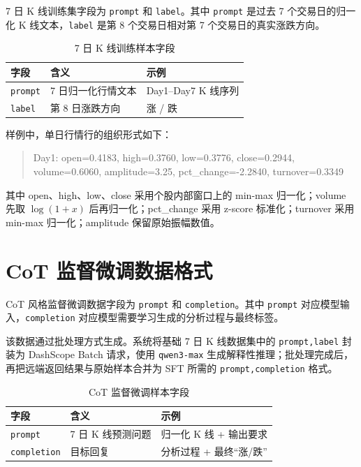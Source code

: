 7 日 K 线训练集字段为 \texttt{prompt} 和 \texttt{label}。其中 \texttt{prompt} 是过去 7 个交易日的归一化 K 线文本，\texttt{label} 是第 8 个交易日相对第 7 个交易日的真实涨跌方向。

\begin{table}[htbp]
  \centering
  \caption{7 日 K 线训练样本字段}
  \begin{tabular}{lll}
    \toprule
    字段 & 含义 & 示例 \\
    \midrule
    \texttt{prompt} & 7 日归一化行情文本 & Day1--Day7 K 线序列 \\
    \texttt{label} & 第 8 日涨跌方向 & 涨 / 跌 \\
    \bottomrule
  \end{tabular}
\end{table}

样例中，单日行情行的组织形式如下：

\begin{quote}\small
Day1: open=0.4183, high=0.3760, low=0.3776, close=0.2944, volume=0.6060, amplitude=3.25, pct\_change=-2.2840, turnover=0.3349
\end{quote}

其中 open、high、low、close 采用个股内部窗口上的 min-max 归一化；volume 先取 \(\log(1+x)\) 后再归一化；pct\_change 采用 z-score 标准化；turnover 采用 min-max 归一化；amplitude 保留原始振幅数值。

\section{CoT 监督微调数据格式}

CoT 风格监督微调数据字段为 \texttt{prompt} 和 \texttt{completion}。其中 \texttt{prompt} 对应模型输入，\texttt{completion} 对应模型需要学习生成的分析过程与最终标签。

该数据通过批处理方式生成。系统将基础 7 日 K 线数据集中的 \texttt{prompt,label} 封装为 DashScope Batch 请求，使用 \texttt{qwen3-max} 生成解释性推理；批处理完成后，再把远端返回结果与原始样本合并为 SFT 所需的 \texttt{prompt,completion} 格式。

\begin{table}[htbp]
  \centering
  \caption{CoT 监督微调样本字段}
  \begin{tabular}{lll}
    \toprule
    字段 & 含义 & 示例 \\
    \midrule
    \texttt{prompt} & 7 日 K 线预测问题 & 归一化 K 线 + 输出要求 \\
    \texttt{completion} & 目标回复 & 分析过程 + 最终“涨/跌” \\
    \bottomrule
  \end{tabular}
\end{table}

